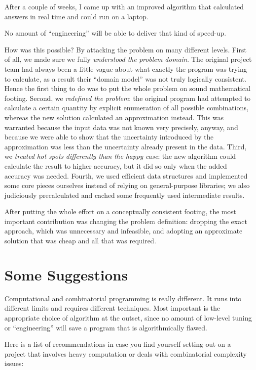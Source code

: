 After a couple of weeks, I came up with an improved algorithm that
calculated answers in real time and could run on a laptop.

No amount of ``engineering'' will be able to deliver that kind of
speed-up.

How was this possible? By attacking the problem on many different
levels.  First of all, we made sure we fully \emph{understood the
  problem domain}. The original project team had always been a little
vague about what exactly the program was trying to calculate, as a
result their ``domain model'' was not truly logically consistent.
Hence the first thing to do was to put the whole problem on sound
mathematical footing.  Second, we \emph{redefined the problem}: the
original program had attempted to calculate a certain quantity by
explicit enumeration of all possible combinations, whereas the new
solution calculated an approximation instead. This was warranted
because the input data was not known very precisely, anyway, and
because we were able to show that the uncertainty introduced by the
approximation was less than the uncertainty already present in the
data. Third, we \emph{treated hot spots differently than the happy
  case}: the new algorithm could calculate the result to higher
accuracy, but it did so only when the added accuracy was needed.
Fourth, we used efficient data structures and implemented some core
pieces ourselves instead of relying on general-purpose libraries; we
also judiciously precalculated and cached some frequently used
intermediate results.

After putting the whole effort on a conceptually consistent footing,
the most important contribution was changing the problem
definition: dropping the exact approach, which was unnecessary and
infeasible, and adopting an approximate solution that was cheap and
all that was required.

\section{Some Suggestions}

Computational and combinatorial programming is really different. It
runs into different limits and requires different techniques. Most
important is the appropriate choice of algorithm at the outset, since
no amount of low-level tuning or ``engineering'' will save a program
that is algorithmically flawed.

Here is a list of recommendations in case you find yourself setting
out on a project that involves heavy computation or deals with
combinatorial complexity issues:

